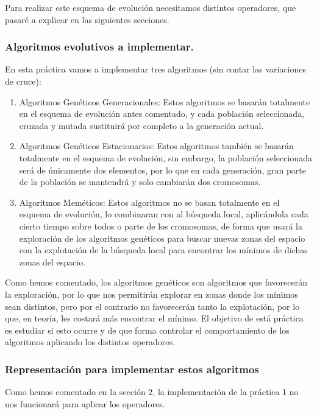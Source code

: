 \documentclass[12pt, spanish]{article}
\begin{document}
Para realizar este esquema de evolución necesitamos distintos operadores, que pasaré a explicar en las siguientes secciones.

\subsubsection{Algoritmos evolutivos a implementar.}

En esta práctica vamos a implementar tres algoritmos (sin contar las variaciones de cruce):

\begin{enumerate}
	\item Algoritmos Genéticos Generacionales: Estos algoritmos se basarán totalmente en el esquema de evolución antes comentado, y cada población seleccionada, cruzada y mutada sustituirá por completo a la generación actual.
	\item Algoritmos Genéticos Estacionarios: Estos algoritmos también se basarán totalmente en el esquema de evolución, sin embargo, la población seleccionada será de únicamente dos elementos, por lo que en cada generación, gran parte de la población se mantendrá y solo cambiarán dos cromosomas.
	\item Algoritmos Meméticos: Estos algoritmos no se basan totalmente en el esquema de evolución, lo combinaran con al búsqueda local, aplicándola cada cierto tiempo sobre todos o parte de los cromosomas, de forma que usará la exploración de los algoritmos genéticos para buscar nuevas zonas del espacio con la explotación de la búsqueda local para encontrar los mínimos de dichas zonas del espacio.
\end{enumerate}

Como hemos comentado, los algoritmos genéticos son algoritmos que favorecerán la exploración, por lo que nos permitirán explorar en zonas donde los mínimos sean distintos, pero por el contrario no favorecerán tanto la explotación, por lo que, en teoría, les costará más encontrar el mínimo. El objetivo de está práctica es estudiar si esto ocurre y de que forma controlar el comportamiento de los algoritmos aplicando los distintos operadores.

\subsubsection{Representación para implementar estos algoritmos}

Como hemos comentado en la sección 2, la implementación de la práctica 1 no nos funcionará para aplicar los operadores.
\end{document}
